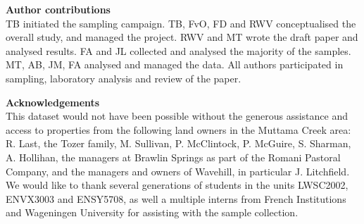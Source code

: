 \documentclass[, manuscript]{copernicus}
\begin{document}
\bigskip

\noindent \textbf{Author contributions}\\
TB initiated the sampling campaign. TB, FvO, FD and RWV conceptualised
the overall study, and managed the project. RWV and MT wrote the draft
paper and analysed results. FA and JL collected and analysed the
majority of the samples. MT, AB, JM, FA analysed and managed the data.
All authors participated in sampling, laboratory analysis and review of
the paper.

\bigskip

\noindent \textbf{Acknowledgements}\\
This dataset would not have been possible without the generous
assistance and access to properties from the following land owners in
the Muttama Creek area: R. Last, the Tozer family, M. Sullivan, P.
McClintock, P. McGuire, S. Sharman, A. Hollihan, the managers at Brawlin
Springs as part of the Romani Pastoral Company, and the managers and
owners of Wavehill, in particular J. Litchfield. We would like to thank
several generations of students in the units LWSC2002, ENVX3003 and
ENSY5708, as well a multiple interns from French Institutions and
Wageningen University for assisting with the sample collection.









\competinginterests{} %









\end{document}
